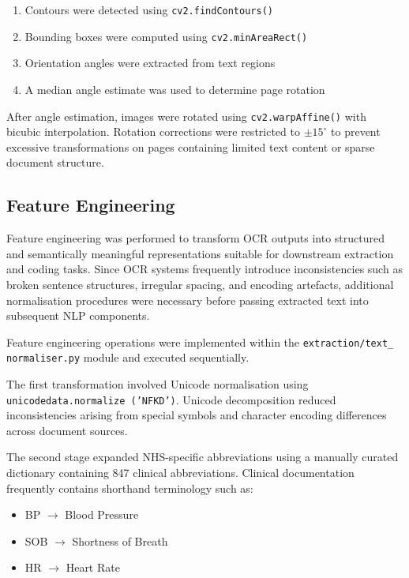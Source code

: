 \begin{enumerate}
\item Contours were detected using \texttt{cv2.findContours()}
\item Bounding boxes were computed using \texttt{cv2.minAreaRect()}
\item Orientation angles were extracted from text regions
\item A median angle estimate was used to determine page rotation
\end{enumerate}

After angle estimation, images were rotated using \texttt{cv2.warpAffine()} with bicubic interpolation. Rotation corrections were restricted to $\pm15^\circ$ to prevent excessive transformations on pages containing limited text content or sparse document structure.

\subsection{Feature Engineering}
Feature engineering was performed to transform OCR outputs into structured and semantically meaningful representations suitable for downstream extraction and coding tasks. Since OCR systems frequently introduce inconsistencies such as broken sentence structures, irregular spacing, and encoding artefacts, additional normalisation procedures were necessary before passing extracted text into subsequent NLP components.

Feature engineering operations were implemented within the \texttt{extraction/text\_ \allowbreak normaliser.py} module and executed sequentially.

The first transformation involved Unicode normalisation using \texttt{unicodedata.normalize \allowbreak ('NFKD')}. Unicode decomposition reduced inconsistencies arising from special symbols and character encoding differences across document sources.

The second stage expanded NHS-specific abbreviations using a manually curated dictionary containing 847 clinical abbreviations. Clinical documentation frequently contains shorthand terminology such as:
\begin{itemize}
    \item BP $\rightarrow$ Blood Pressure
    \item SOB $\rightarrow$ Shortness of Breath
    \item HR $\rightarrow$ Heart Rate
\end{itemize}


